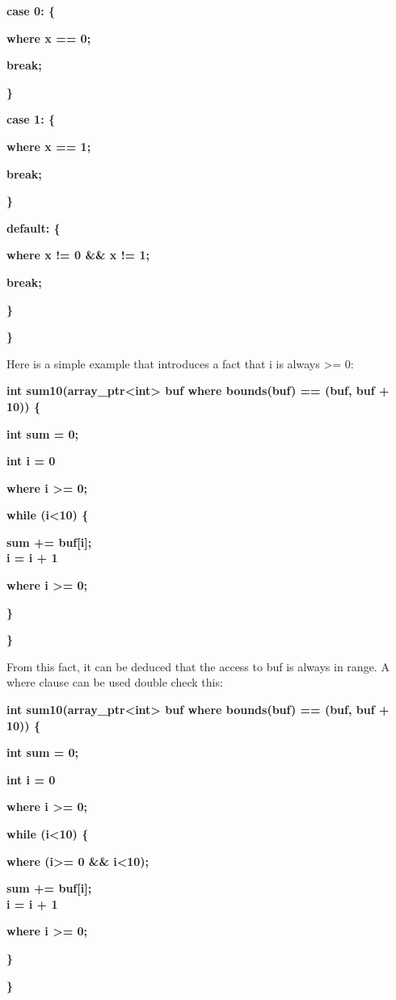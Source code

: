 \documentclass[]{article}
\begin{document}
\textbf{case 0: \{}

\textbf{where x == 0;}

\textbf{break;}

\textbf{\}}

\textbf{case 1: \{}

\textbf{where x == 1;}

\textbf{break;}

\textbf{\} }

\textbf{default: \{}

\textbf{where x != 0 \&\& x != 1;}

\textbf{break;}

\textbf{\}}

\textbf{\}}

Here is a simple example that introduces a fact that i is always
\textgreater{}= 0:

\textbf{int sum10(array\_ptr\textless{}int\textgreater{} buf where
bounds(buf) == (buf, buf + 10)) \{}

\textbf{int sum = 0;}

\textbf{int i = 0}

\textbf{where i \textgreater{}= 0;}

\textbf{while (i\textless{}10) \{}

\textbf{sum += buf{[}i{]};\\
i = i + 1}

\textbf{where i \textgreater{}= 0;}

\textbf{\}}

\textbf{\}}

From this fact, it can be deduced that the access to buf is always in
range. A where clause can be used double check this:

\textbf{int sum10(array\_ptr\textless{}int\textgreater{} buf where
bounds(buf) == (buf, buf + 10)) \{}

\textbf{int sum = 0;}

\textbf{int i = 0}

\textbf{where i \textgreater{}= 0;}

\textbf{while (i\textless{}10) \{}

\textbf{where (i\textgreater{}= 0 \&\& i\textless{}10);}

\textbf{sum += buf{[}i{]};\\
i = i + 1}

\textbf{where i \textgreater{}= 0;}

\textbf{\}}

\textbf{\}}
\end{document}
